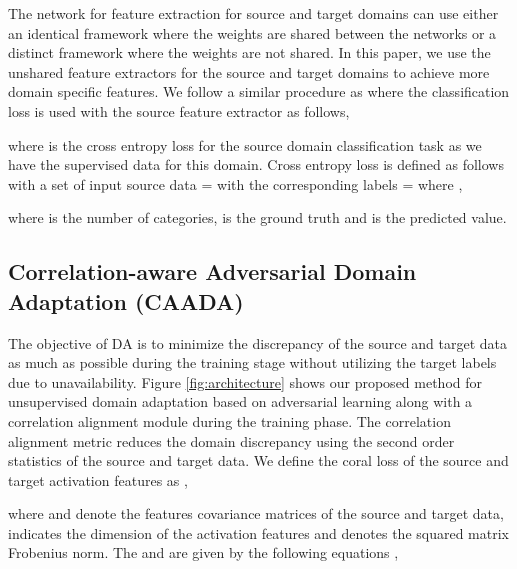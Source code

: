 \documentclass[review]{elsarticle}
\begin{document}
        
       








        







The network for feature extraction for source and target domains can use either an identical framework \cite{pmlr-v37-ganin15} where the weights are shared between the networks or a distinct framework \cite{8099799} where the weights are not shared. In this paper, we use the unshared feature extractors for the source and target domains to achieve more domain specific features. We follow a similar procedure as  \cite{8099799} where the classification loss is used with the source feature extractor as follows,




\noindent where  is the cross entropy loss for the source domain classification task as we have the supervised data for this domain. Cross entropy loss is defined as follows with a set of input source data  =  with the corresponding labels  =  where ,



where  is the number of categories,  is the ground truth and  is the predicted value.
\subsection{Correlation-aware Adversarial Domain Adaptation (CAADA)}

The objective of DA is to minimize the discrepancy of the source and target data as much as possible during the training stage without utilizing the target labels due to unavailability. Figure \ref{fig:architecture} shows our proposed method for unsupervised domain adaptation based on adversarial learning along with a correlation alignment module during the training phase. The correlation alignment metric reduces the domain discrepancy using the second order statistics of the source and target data. We define the coral loss of the source and target activation features as \cite{dcoral},



\noindent where  and  denote the features covariance matrices of the source and target data,  indicates the dimension of the activation features and  denotes the squared matrix Frobenius norm. The  and  are given by the following equations \cite{dcoral},
\end{document}
